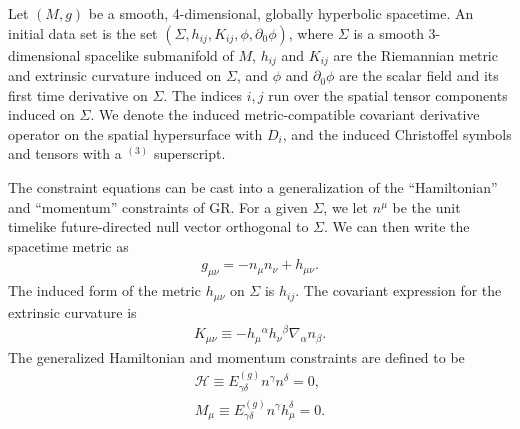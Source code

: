 \documentclass{ws-ijmpd}
\begin{document}
Let $\left(M,g\right)$ be a smooth, 4-dimensional, globally hyperbolic
spacetime. An initial data set is the set 
$\left(\Sigma,h_{ij},K_{ij},\phi,\partial_0\phi\right)$, 
where $\Sigma$ is a smooth 3-dimensional spacelike submanifold
of $M$, $h_{ij}$ and $K_{ij}$ are
the Riemannian metric and extrinsic curvature induced on $\Sigma$,
and $\phi$ and $\partial_0\phi$ are the scalar field and its first time
derivative on $\Sigma$.
The indices $i,j$ run over the spatial tensor components induced
on $\Sigma$.
We denote the induced metric-compatible covariant derivative
operator on the spatial hypersurface with $D_i$, and the
induced Christoffel symbols and tensors with a ${}^{(3)}$ superscript.

The constraint equations can be cast into a generalization
of the ``Hamiltonian'' and ``momentum'' constraints of GR.
For a given $\Sigma$, we let $n^{\mu}$ be the unit timelike future-directed
null vector orthogonal to $\Sigma$.
We can then write the spacetime metric as 
\begin{align}
   \label{eq:covariant_3p1_decomp}
   g_{\mu\nu}
   =
   -
   n_{\mu}n_{\nu}
   +
   h_{\mu\nu}
   .
\end{align}
The induced form of the metric $h_{\mu\nu}$ on $\Sigma$ is $h_{ij}$.
The covariant expression for the extrinsic curvature is
\begin{align}
   K_{\mu\nu}
   \equiv
   -
   h_{\mu}{}^{\alpha}h_{\nu}{}^{\beta}\nabla_{\alpha}n_{\beta}
   .
\end{align}
The generalized Hamiltonian and momentum constraints are defined to be 
\begin{align}
   \label{eq:general_hamiltonian_constraint}
   \mathcal{H}
   \equiv
   E^{(g)}_{\gamma\delta}n^{\gamma}n^{\delta}
   =
   0
   ,\\
   \label{eq:general_momentum_constraint}
   M_{\mu}
   \equiv
   E^{(g)}_{\gamma\delta}n^{\gamma}h^{\delta}_{\mu}
   =
   0
   .
\end{align}
\end{document}
